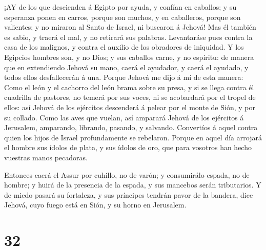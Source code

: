  ¡AY de los que descienden á Egipto por ayuda, y confían en
caballos; y su esperanza ponen en carros, porque son muchos, y en
caballeros, porque son valientes; y no miraron al Santo de Israel, ni
buscaron á Jehová!  Mas él también es sabio, y traerá el
mal, y no retirará sus palabras. Levantaráse pues contra la casa de los
malignos, y contra el auxilio de los obradores de iniquidad.
 Y los Egipcios hombres son, y no Dios; y sus caballos
carne, y no espíritu: de manera que en extendiendo Jehová su mano, caerá
el ayudador, y caerá el ayudado, y todos ellos desfallecerán á una.
 Porque Jehová me dijo á mí de esta manera: Como el león y
el cachorro del león brama sobre su presa, y si se llega contra él
cuadrilla de pastores, no temerá por sus voces, ni se acobardará por el
tropel de ellos: así Jehová de los ejércitos descenderá á pelear por el
monte de Sión, y por su collado.  Como las aves que vuelan,
así amparará Jehová de los ejércitos á Jerusalem, amparando, librando,
pasando, y salvando.  Convertíos á aquel contra quien los
hijos de Israel profundamente se rebelaron.  Porque en aquel
día arrojará el hombre sus ídolos de plata, y sus ídolos de oro, que
para vosotros han hecho vuestras manos pecadoras.

 Entonces caerá el Assur por cuhillo, no de varón; y
consumirálo espada, no de hombre; y huirá de la presencia de la espada,
y sus mancebos serán tributarios.  Y de miedo pasará su
fortaleza, y sus príncipes tendrán pavor de la bandera, dice Jehová,
cuyo fuego está en Sión, y su horno en Jerusalem.

\hypertarget{section-31}{%
\section{32}\label{section-31}}

